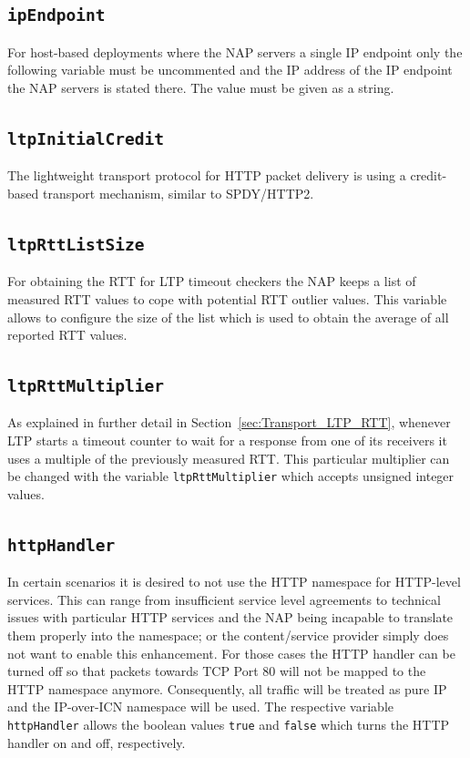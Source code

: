 \documentclass[a4paper,11pt,titlepage]{report}
\begin{document}
\subsection{\texttt{ipEndpoint}}
For host-based deployments where the \ac{NAP} servers a single IP endpoint only the following variable must be uncommented and the IP address of the IP endpoint the NAP servers is stated there. The value must be given as a string.

\subsection{\texttt{ltpInitialCredit}}\label{sec:Introduction_Var_ltpInitialCredit}
The lightweight transport protocol for \ac{HTTP} packet delivery is using a credit-based transport mechanism, similar to SPDY/HTTP2. 

\subsection{\texttt{ltpRttListSize}}\label{sec:Introduction_Var_ltpRttListSize}
For obtaining the \ac{RTT} for \ac{LTP} timeout checkers the \ac{NAP} keeps a list of measured \ac{RTT} values to cope with potential \ac{RTT} outlier values. This variable allows to configure the size of the list which is used to obtain the average of all reported \ac{RTT} values.

\subsection{\texttt{ltpRttMultiplier}}\label{sec:Introduction_Var_ltpRttMultiplier}
As explained in further detail in Section~\ref{sec:Transport_LTP_RTT}, whenever \ac{LTP} starts a timeout counter to wait for a response from one of its receivers it uses a multiple of the previously measured \ac{RTT}. This particular multiplier can be changed with the variable \texttt{ltpRttMultiplier} which accepts unsigned integer values.

\subsection{\texttt{httpHandler}}\label{sec:Introduction_Var_httpHandler}
In certain scenarios it is desired to not use the HTTP namespace for HTTP-level services. This can range from insufficient service level agreements to technical issues with particular HTTP services and the \ac{NAP} being incapable to translate them properly into the namespace; or the content/service provider simply does not want to enable this enhancement. For those cases the \ac{HTTP} handler can be turned off so that packets towards TCP Port 80 will not be mapped to the \ac{HTTP} namespace anymore. Consequently, all traffic will be treated as pure IP and the IP-over-ICN namespace will be used. The respective variable \texttt{httpHandler} allows the boolean values \texttt{true} and \texttt{false} which turns the \ac{HTTP} handler on and off, respectively.
\end{document}
